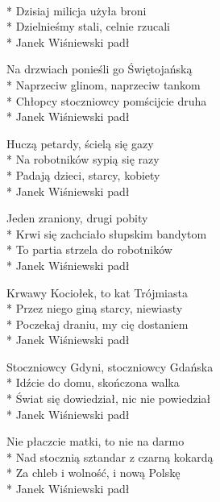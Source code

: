 \begin{lyrics}[longestline={Świat się dowiedział, nic nie powiedział}]

\\*
Dzisiaj milicja użyła broni\\*
Dzielnieśmy stali, celnie rzucali\\*
Janek Wiśniewski padł

Na drzwiach ponieśli go Świętojańską\\*
Naprzeciw glinom, naprzeciw tankom\\*
Chłopcy stoczniowcy pomścijcie druha\\*
Janek Wiśniewski padł

Huczą petardy, ścielą się gazy\\*
Na robotników sypią się razy\\*
Padają dzieci, starcy, kobiety\\*
Janek Wiśniewski padł

Jeden zraniony, drugi pobity\\*
Krwi się zachciało słupskim bandytom\\*
To partia strzela do robotników\\*
Janek Wiśniewski padł

Krwawy Kociołek, to kat Trójmiasta\\*
Przez niego giną starcy, niewiasty\\*
Poczekaj draniu, my cię dostaniem\\*
Janek Wiśniewski padł

Stoczniowcy Gdyni, stoczniowcy Gdańska\\*
Idźcie do domu, skończona walka\\*
Świat się dowiedział, nic nie powiedział\\*
Janek Wiśniewski padł

Nie płaczcie matki, to nie na darmo\\*
Nad stocznią sztandar z czarną kokardą\\*
Za chleb i wolność, i nową Polskę\\*
Janek Wiśniewski padł
\end{lyrics}




